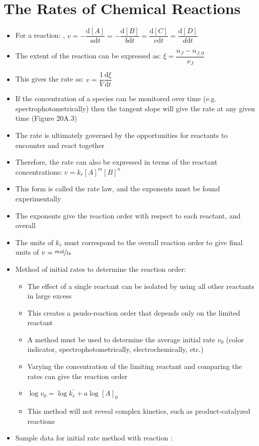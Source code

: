\documentclass[12pt, openany, letterpaper]{memoir}
\begin{document}
\section{The Rates of Chemical Reactions}
\begin{itemize}
	\item For a reaction: , $v=-\dfrac{\mathrm{d}[A]}{a\mathrm{d}t} = -\dfrac{\mathrm{d}[B]}{b\mathrm{d}t} = \dfrac{\mathrm{d}[C]}{c\mathrm{d}t} = \dfrac{\mathrm{d}[D]}{d\mathrm{d}t}$
	\item The extent of the reaction can be expressed as: $\xi=\dfrac{n_J-n_{J,0}}{\nu_J}$
	\item This gives the rate as: $v = \dfrac{1}{V}\dfrac{\mathrm{d}\xi}{\mathrm{d}t}$
	\item If the concentration of a species can be monitored over time (e.g. spectrophotometrically) then the tangent slope will give the rate at any given time (Figure 20A.3)
	\item The rate is ultimately governed by the opportunities for reactants to encounter and react together
	\item Therefore, the rate can also be expressed in terms of the reactant concentrations: $v=k_r[A]^m[B]^n$
	\item This form is called the rate law, and the exponents must be found experimentally
	\item The exponents give the reaction order with respect to each reactant, and overall
	\item The units of $k_r$ must correspond to the overall reaction order to give final units of $v=\nicefrac{mol}{ls}$
	\item Method of initial rates to determine the reaction order:
	      \begin{itemize}
		      \item The effect of a single reactant can be isolated by using all other reactants in large excess
		      \item This creates a psudo-reaction order that depends only on the limited reactant
		      \item A method must be used to determine the average initial rate $v_0$ (color indicator, spectrophotometrically, electrochemically, etc.)
		      \item Varying the concentration of the limiting reactant and comparing the rates can give the reaction order
		      \item $\log v_0 = \log k_r^\prime + a \log [A]_0$
		      \item This method will not reveal complex kinetics, such as product-catalyzed reactions
	      \end{itemize}
	\item Sample data for initial rate method with reaction :
\end{itemize}
\end{document}
